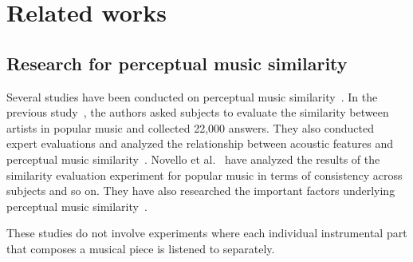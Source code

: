 \section{Related works}
\label{sec:related_works}

\subsection{Research for perceptual music similarity}
Several studies have been conducted on perceptual music similarity~\cite{McAdams2001, Eerola2001, Berenzwei2003, Novello2006, Mullensiefen2007, Typke2005, Novello2011, Volk2012}. In the previous study~\cite{Ellis2002}, the authors asked subjects to evaluate the similarity between artists in popular music and collected 22,000 answers. They also conducted expert evaluations and analyzed the relationship between acoustic features and perceptual music similarity~\cite{Berenzwei2003}. Novello et al.~\cite{Novello2006} have analyzed the results of the similarity evaluation experiment for popular music in terms of consistency across subjects and so on. They have also researched the important factors underlying perceptual music similarity~\cite{Novello2011}. 
\par
These studies do not involve experiments where each individual instrumental part that composes a musical piece is listened to separately.


